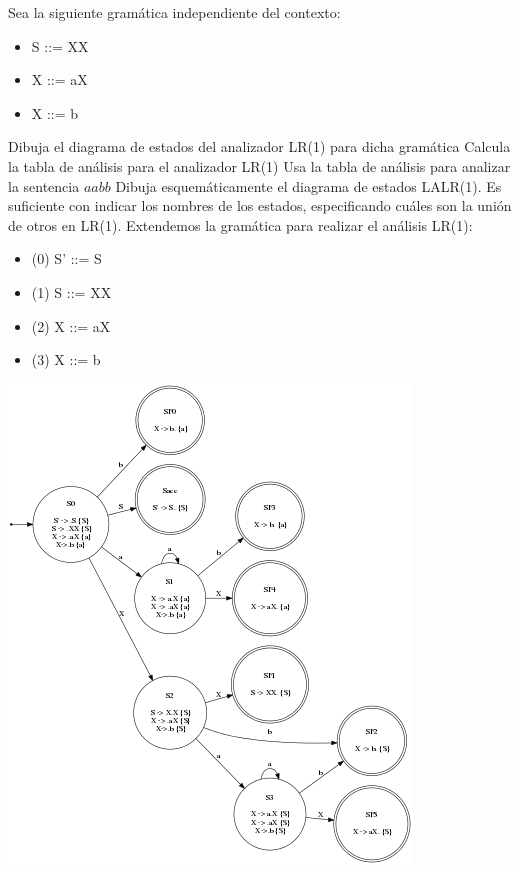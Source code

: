 \begin{problem}
Sea la siguiente gramática independiente del contexto:
\begin{itemize}
\item S ::= XX
\item X ::= aX
\item X ::= b
\end{itemize}
\ppart Dibuja el diagrama de estados del analizador LR(1) para dicha gramática
\ppart Calcula la tabla de análisis para el analizador LR(1)
\ppart Usa la tabla de análisis para analizar la sentencia $aabb$
\ppart Dibuja esquemáticamente el diagrama de estados LALR(1). Es suficiente con indicar los nombres de los estados, especificando cuáles son la unión de otros en LR(1).
\solution
\ppart Extendemos la gramática para realizar el análisis LR(1):

\begin{itemize}
\item (0) S' ::= S
\item (1) S ::= XX
\item (2) X ::= aX
\item (3) X ::= b
\end{itemize}
\begin{center}
\includegraphics[scale=0.65]{tex/ejerciciosHoja3/automata9.png}
\end{center}


\end{problem}
